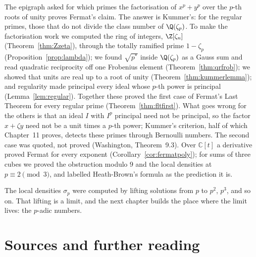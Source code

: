 The epigraph asked for which primes the factorisation of $x^p+y^p$ over the $p$-th roots of unity proves Fermat's claim. The
answer is Kummer's: for the regular primes, those that do not divide the class number of $\Q(\zeta_p)$. To make the
factorisation work we computed the ring of integers, $\Z[\zeta_n]$ (Theorem~\ref{thm:Zzeta}), through the totally ramified
prime $1-\zeta_p$ (Proposition~\ref{prop:lambda}); we found $\sqrt{p^*}$ inside $\Q(\zeta_p)$ as a Gauss sum and read
quadratic reciprocity off one Frobenius element (Theorem~\ref{thm:qrfrob}); we showed that units are real up to a root of
unity (Theorem~\ref{thm:kummerlemma}); and regularity made principal every ideal whose $p$-th power is principal
(Lemma~\ref{lem:regular}). Together these proved the first case of Fermat's Last Theorem for every regular prime
(Theorem~\ref{thm:fltfirst}). What goes wrong for the others is that an ideal $I$ with $I^p$ principal need not be principal,
so the factor $x+\zeta y$ need not be a unit times a $p$-th power; Kummer's criterion, half of which Chapter~11 proves,
detects these primes through Bernoulli numbers. The second case
was quoted, not proved (Washington, Theorem~9.3). Over $\mathbb C[t]$ a derivative proved Fermat for every exponent
(Corollary~\ref{cor:fermatpoly}); for sums of three cubes we proved the obstruction modulo $9$ and the local densities at
$p\equiv2\pmod3$, and labelled Heath-Brown's formula as the prediction it is.

The local densities $\sigma_p$ were computed by lifting solutions from $p$ to $p^2$, $p^3$, and so on. That lifting is a
limit, and the next chapter builds the place where the limit lives: the $p$-adic numbers.

\section*{Sources and further reading}

